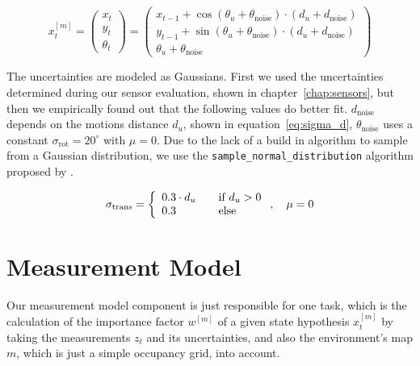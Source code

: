 \begin{equation}\label{eq:sample_motion}
	x^{[m]}_t = \left(
    \begin{array}{c}
      x_t\\
      y_t\\
      \theta_t
    \end{array}
  \right) = \left(\begin{array}{c} x_{t-1} + \cos(\theta_u + \theta_{\text{noise}})\cdot (d_u + d_\text{noise}) \\ y_{t-1} + \sin(\theta_u + \theta_{\text{noise}})\cdot (d_u + d_\text{noise}) \\ \theta_u + \theta_{\text{noise}}
    \end{array}
  \right)
\end{equation}

The uncertainties are modeled as Gaussians. First we used the uncertainties determined during our sensor evaluation, shown in chapter~\ref{chap:sensors}, but then we empirically found out that the following values do better fit. $d_\text{noise}$ depends on the motions distance $d_u$, shown in equation~\ref{eq:sigma_d}, $\theta_\text{noise}$ uses a constant $\sigma_\text{rot} = 20^{\circ}$ with $\mu = 0$. Due to the lack of a build in algorithm to sample from a Gaussian distribution, we use the \texttt{sample\_normal\_distribution} algorithm proposed by \citet[p.~124]{thrun:prob_robo}.

\begin{equation}\label{eq:sigma_d}
	\sigma_{\text{trans}} = \left\{ 
  \begin{array}{l l}
    0.3 \cdot d_u & \quad \text{if $d_u > 0$}\\
    0.3 & \quad \text{else}
  \end{array} \right. ,\quad \mu = 0
\end{equation}


\section{Measurement Model}\label{sec:algo_measurement_model}
Our measurement model component is just responsible for one task, which is the calculation of the importance factor $w^{[m]}$ of a given state hypothesis $x^{[m]}_t$ by taking the measurements $z_t$ and its uncertainties, and also the environment's map $m$, which is just a simple occupancy grid, into account.

